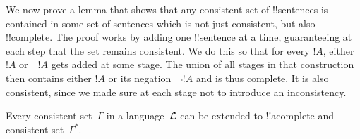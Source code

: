 \documentclass[../../../include/open-logic-section]{subfiles}
\begin{document}
      {}
      {}


\begin{explain}
We now prove a lemma that shows that any consistent set of
!!{sentence}s is contained in some set of sentences which is not just
consistent, but also !!{complete}. The proof works by adding one
!!{sentence} at a time, guaranteeing at each step that the set remains
consistent. We do this so that for every $!A$, either $!A$ or $\lnot
!A$ gets added at some stage. The union of all stages in that
construction then contains either $!A$ or its negation~$\lnot !A$ and
is thus complete. It is also consistent, since we made sure at each
stage not to introduce an inconsistency.
\end{explain}

\begin{lem}
 Every consistent
set~$\Gamma$ in a language~$\Lang{L}$ can be
extended to !!a{complete} and consistent set~$\Gamma^*$.
\end{lem}
\end{document}
